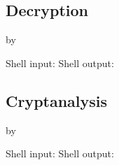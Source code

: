 
\subsection{Decryption}
by \bob \bigskip

Shell input: \decryptindemo
Shell output: \decryptoutdemo


\subsection{Cryptanalysis}
by \eve \bigskip

Shell input: \cryptanalyzeindemo
Shell output: \cryptanalyzeoutdemo
